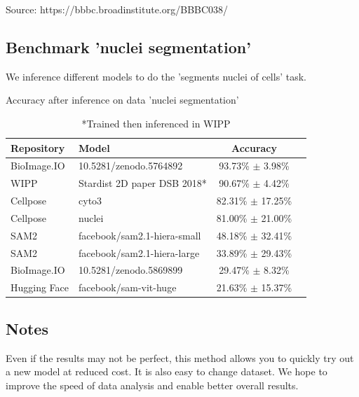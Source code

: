 \medskip

Source: https://bbbc.broadinstitute.org/BBBC038/

\subsection{Benchmark 'nuclei segmentation'}

We inference different models to do the 'segments nuclei of cells' task.

\begin{table}[H]
  \footnotesize
  \centering
  \caption{Accuracy after inference on data 'nuclei segmentation'}
  \begin{tabular}{llcc}
    \toprule
    Repository    & Model                       & Accuracy               \\ [0.5ex]
    \midrule
    BioImage.IO  & 10.5281/zenodo.5764892        & 93.73\% $\pm$ 3.98\%  \\
    WIPP         & Stardist 2D paper DSB 2018*   & 90.67\% $\pm$ 4.42\%  \\
    Cellpose     & cyto3                         & 82.31\% $\pm$ 17.25\% \\
    Cellpose     & nuclei                        & 81.00\% $\pm$ 21.00\% \\
    SAM2         & facebook/sam2.1-hiera-small   & 48.18\% $\pm$ 32.41\% \\
    SAM2         & facebook/sam2.1-hiera-large   & 33.89\% $\pm$ 29.43\% \\
    BioImage.IO  & 10.5281/zenodo.5869899        & 29.47\% $\pm$ 8.32\%  \\
    Hugging Face & facebook/sam-vit-huge         & 21.63\% $\pm$ 15.37\% \\
    \bottomrule
  \end{tabular}
  \caption*{*Trained then inferenced in WIPP}
\end{table}

\subsection{Notes}

Even if the results may not be perfect, this method allows you to quickly try
out a new model at reduced cost. It is also easy to change dataset. We hope to
improve the speed of data analysis and enable better overall results.
